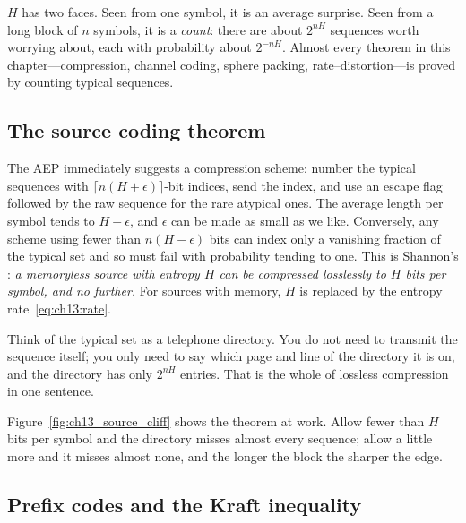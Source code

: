 \begin{keyidea}
$H$ has two faces. Seen from one symbol, it is an average surprise. Seen from a long block of $n$
symbols, it is a \emph{count}: there are about $2^{nH}$ sequences worth worrying about, each with
probability about $2^{-nH}$. Almost every theorem in this chapter---compression, channel coding,
sphere packing, rate--distortion---is proved by counting typical sequences.
\end{keyidea}

\subsection{The source coding theorem}

The AEP immediately suggests a compression scheme: number the typical sequences with
$\lceil n(H+\epsilon)\rceil$-bit indices, send the index, and use an escape flag followed by the
raw sequence for the rare atypical ones. The average length per symbol tends to
$H+\epsilon$, and $\epsilon$ can be made as small as we like. Conversely, any scheme using fewer
than $n(H-\epsilon)$ bits can index only a vanishing fraction of the typical set and so must fail
with probability tending to one. This is Shannon's : \emph{a
memoryless source with entropy $H$ can be compressed losslessly to $H$ bits per symbol, and no
further.} For sources with memory, $H$ is replaced by the entropy rate~\eqref{eq:ch13:rate}.

Think of the typical set as a telephone directory. You do not need to transmit the sequence
itself; you only need to say which page and line of the directory it is on, and the directory has
only $2^{nH}$ entries. That is the whole of lossless compression in one sentence.


Figure~\ref{fig:ch13_source_cliff} shows the theorem at work. Allow fewer than $H$ bits per symbol
and the directory misses almost every sequence; allow a little more and it misses almost none, and
the longer the block the sharper the edge.

\subsection{Prefix codes and the Kraft inequality}

